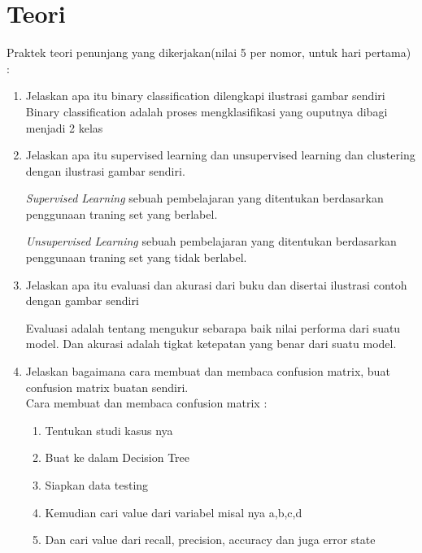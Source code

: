 \section{Teori}
Praktek teori penunjang yang dikerjakan(nilai 5 per nomor, untuk hari pertama) :
\begin{enumerate}
\item
Jelaskan apa itu binary classification dilengkapi ilustrasi gambar sendiri\\
Binary classification adalah proses mengklasifikasi yang ouputnya dibagi menjadi 2 kelas 

\item
Jelaskan apa itu supervised learning dan unsupervised learning dan clustering dengan ilustrasi gambar sendiri.
\par
    \textit{Supervised Learning} sebuah pembelajaran yang ditentukan berdasarkan penggunaan traning set yang berlabel.
\par
    \textit{Unsupervised Learning} sebuah pembelajaran yang ditentukan berdasarkan penggunaan traning set yang tidak berlabel. 

\item
Jelaskan apa itu evaluasi dan akurasi dari buku dan disertai ilustrasi contoh dengan gambar sendiri
\par
    Evaluasi adalah tentang mengukur sebarapa baik nilai performa dari suatu model. Dan akurasi adalah tigkat ketepatan yang benar dari suatu model.
    
\item
Jelaskan bagaimana cara membuat dan membaca confusion matrix, buat confusion matrix buatan sendiri.\\
Cara membuat dan membaca confusion matrix :
\begin{enumerate}
    \item Tentukan studi kasus nya
    \item Buat ke dalam Decision Tree
    \item Siapkan data testing 
    \item Kemudian cari value dari variabel misal nya a,b,c,d
    \item Dan cari value dari recall, precision, accuracy dan juga error state
\end{enumerate}


\end{enumerate}
